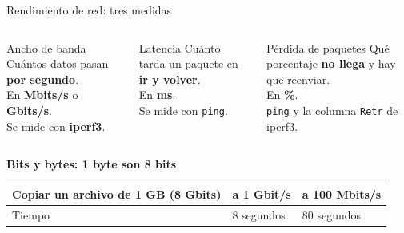 \documentclass[aspectratio=169,10pt,c]{beamer}
\begin{document}
\begin{frame}{Rendimiento de red: tres medidas}
\begin{columns}[T,onlytextwidth]
\begin{block}{Ancho de banda}
\small Cuántos datos pasan \textbf{por segundo}.\\
En \textbf{Mbits/s} o \textbf{Gbits/s}.\\
Se mide con \textbf{iperf3}.
\end{block}
\begin{block}{Latencia}
\small Cuánto tarda un paquete en \textbf{ir y volver}.\\
En \textbf{ms}.\\
Se mide con \texttt{ping}.
\end{block}
\begin{block}{Pérdida de paquetes}
\small Qué porcentaje \textbf{no llega} y hay que reenviar.\\
En \textbf{\%}.\\
\texttt{ping} y la columna \texttt{Retr} de iperf3.
\end{block}
\end{columns}
\vspace{4mm}
\textbf{\small Bits y bytes: 1 byte son 8 bits}\par\smallskip
\renewcommand{\arraystretch}{1.25}
\small
\begin{center}
\begin{tabular}{@{}lll@{}}
\toprule
\textbf{Copiar un archivo de 1 GB} (8 Gbits) & \textbf{a 1 Gbit/s} & \textbf{a 100 Mbits/s}\\
\midrule
Tiempo & 8 segundos & 80 segundos\\
\bottomrule
\end{tabular}
\end{center}
\end{frame}
\end{document}
